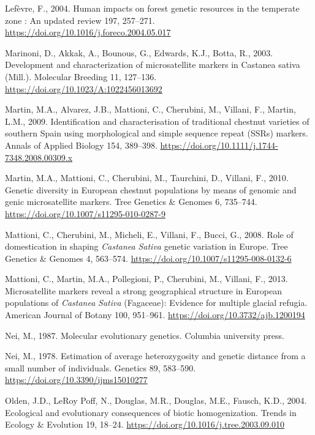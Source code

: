 \documentclass[12pt,a4paper,]{report}
\begin{document}
\leavevmode\hypertarget{ref-Lefevre2004}{}%
Lefèvre, F., 2004. Human impacts on forest genetic resources in the
temperate zone : An updated review 197, 257--271.
\url{https://doi.org/10.1016/j.foreco.2004.05.017}

\leavevmode\hypertarget{ref-marinoni_development_2003}{}%
Marinoni, D., Akkak, A., Bounous, G., Edwards, K.J., Botta, R., 2003.
Development and characterization of microsatellite markers in Castanea
sativa (Mill.). Molecular Breeding 11, 127--136.
\url{https://doi.org/10.1023/A:1022456013692}

\leavevmode\hypertarget{ref-martin_identification_2009}{}%
Martin, M.A., Alvarez, J.B., Mattioni, C., Cherubini, M., Villani, F.,
Martin, L.M., 2009. Identification and characterisation of traditional
chestnut varieties of southern Spain using morphological and simple
sequence repeat (SSRs) markers. Annals of Applied Biology 154, 389--398.
\url{https://doi.org/10.1111/j.1744-7348.2008.00309.x}

\leavevmode\hypertarget{ref-martin_genetic_2010}{}%
Martin, M.A., Mattioni, C., Cherubini, M., Taurchini, D., Villani, F.,
2010. Genetic diversity in European chestnut populations by means of
genomic and genic microsatellite markers. Tree Genetics \& Genomes 6,
735--744. \url{https://doi.org/10.1007/s11295-010-0287-9}

\leavevmode\hypertarget{ref-Mattioni2008}{}%
Mattioni, C., Cherubini, M., Micheli, E., Villani, F., Bucci, G., 2008.
Role of domestication in shaping \emph{Castanea} \emph{Sativa} genetic
variation in Europe. Tree Genetics \& Genomes 4, 563--574.
\url{https://doi.org/10.1007/s11295-008-0132-6}

\leavevmode\hypertarget{ref-Mattioni2013}{}%
Mattioni, C., Martin, M.A., Pollegioni, P., Cherubini, M., Villani, F.,
2013. Microsatellite markers reveal a strong geographical structure in
European populations of \emph{Castanea} \emph{Sativa} (Fagaceae):
Evidence for multiple glacial refugia. American Journal of Botany 100,
951--961. \url{https://doi.org/10.3732/ajb.1200194}

\leavevmode\hypertarget{ref-nei1987molecular}{}%
Nei, M., 1987. Molecular evolutionary genetics. Columbia university
press.

\leavevmode\hypertarget{ref-Nei1978}{}%
Nei, M., 1978. Estimation of average heterozygosity and genetic distance
from a small number of individuals. Genetics 89, 583--590.
\url{https://doi.org/10.3390/ijms15010277}

\leavevmode\hypertarget{ref-olden_ecological_2004}{}%
Olden, J.D., LeRoy Poff, N., Douglas, M.R., Douglas, M.E., Fausch, K.D.,
2004. Ecological and evolutionary consequences of biotic homogenization.
Trends in Ecology \& Evolution 19, 18--24.
\url{https://doi.org/10.1016/j.tree.2003.09.010}
\end{document}
